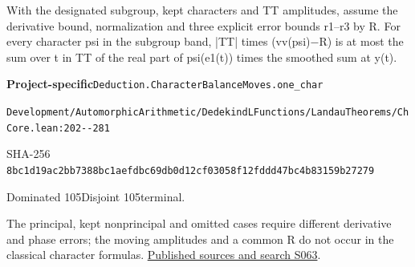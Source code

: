 
\begin{formalstatement}[D564]\label{decomp:D564}
With the designated subgroup, kept characters and TT amplitudes, assume the derivative bound, normalization and three explicit error bounds r1–r3 by R. For every character psi in the subgroup band, |TT| times (vv(psi)\ensuremath{-}R) is at most the sum over t in TT of the real part of psi(e1(t)) times the smoothed sum at y(t).
\end{formalstatement}
{\small\raggedright\noindent\textsf{\bfseries Project-specific}\quad \nolinkurl{Deduction.CharacterBalanceMoves.one_char}\par\noindent \nolinkurl{Development/AutomorphicArithmetic/DedekindLFunctions/LandauTheorems/ChCore.lean:202--281}\par\noindent SHA-256 \nolinkurl{8bc1d19ac2bb7388bc1aefdbc69db0d12cf03058f12fddd47bc4b83159b27279}\par\noindent Dominated 105\quad Disjoint 105\quad terminal.\par}
The principal, kept nonprincipal and omitted cases require different derivative and phase errors; the moving amplitudes and a common R do not occur in the classical character formulas.
\hyperref[lit:S063]{Published sources and search S063}.
